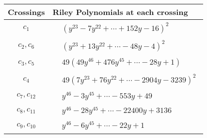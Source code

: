 \documentclass[1p]{elsarticle_modified}
\theoremstyle{definition}
\begin{document}
\begin{tabular}{m{50pt}|m{274pt}}
Crossings & \hspace{64pt}Riley Polynomials at each crossing \\
\hline $$\begin{aligned}c_{1}\end{aligned}$$&$\begin{aligned}
&(y^{23}-7 y^{22}+\cdots+152 y-16)^{2}
\end{aligned}$\\
\hline $$\begin{aligned}c_{2},c_{6}\end{aligned}$$&$\begin{aligned}
&(y^{23}+13 y^{22}+\cdots-48 y-4)^{2}
\end{aligned}$\\
\hline $$\begin{aligned}c_{3},c_{5}\end{aligned}$$&$\begin{aligned}
&49(49 y^{46}+476 y^{45}+\cdots-28 y+1)
\end{aligned}$\\
\hline $$\begin{aligned}c_{4}\end{aligned}$$&$\begin{aligned}
&49(7 y^{23}+76 y^{22}+\cdots-2904 y-3239)^{2}
\end{aligned}$\\
\hline $$\begin{aligned}c_{7},c_{12}\end{aligned}$$&$\begin{aligned}
&y^{46}-3 y^{45}+\cdots-553 y+49
\end{aligned}$\\
\hline $$\begin{aligned}c_{8},c_{11}\end{aligned}$$&$\begin{aligned}
&y^{46}-28 y^{45}+\cdots-22400 y+3136
\end{aligned}$\\
\hline $$\begin{aligned}c_{9},c_{10}\end{aligned}$$&$\begin{aligned}
&y^{46}-6 y^{45}+\cdots-22 y+1
\end{aligned}$\\
\hline
\end{tabular}\\~\\
\end{document}
